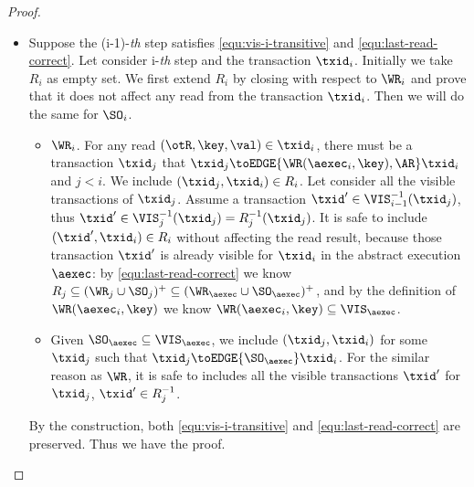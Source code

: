 \begin{proof}
\begin{itemize}
    \item {}
    Suppose the (i-1)-\emph{th} step satisfies \cref{equ:vis-i-transitive} and \cref{equ:last-read-correct}.
    Let consider i-\emph{th} step and the transaction \( \txid_i \).
    Initially we take \( R_i \) as empty set.
    We first extend \( R_i \) by closing with respect to \( \WR_i \)
    and prove that it does not affect any read from the transaction \( \txid_i \).
    Then we will do the same for \( \SO_i \).
    \begin{itemize}
        \item \( \WR_i\). For any read \( (\otR, \key, \val ) \in \txid_i \),
        there must be a transaction \( \txid_j \) that \( \txid_j \toEDGE{\WR(\aexec_i,\key), \AR} \txid_i \) and \( j < i \).
        We include \( (\txid_j, \txid_i) \in R_i \).
        Let consider all the visible transactions of \( \txid_j \).
        Assume a transaction \( \txid' \in \VIS_{i-1}^{-1}(\txid_j) \), 
        thus \( \txid' \in \VIS_{j}^{-1}(\txid_j) = R_j^{-1}(\txid_j) \).
        It is safe to include \( (\txid', \txid_i) \in R_i \) without affecting the read result,
        because those transaction \( \txid' \) is already visible for \( \txid_i \) in the abstract execution \( \aexec \):
        by \cref{equ:last-read-correct} we know \( R_j \subseteq (\WR_j \cup \SO_j)^{+} \subseteq (\WR_\aexec \cup \SO_\aexec)^{+}\),
        and by the definition of \( \WR(\aexec_i,\key) \) we know \( \WR(\aexec_i,\key) \subseteq \VIS_\aexec\).

        \item Given \( \SO_\aexec \subseteq \VIS_\aexec \), we include \( (\txid_j,\txid_i) \) for some \( \txid_j \)
        such that \( \txid_j \toEDGE{\SO_\aexec} \txid_i\).
        For the similar reason as \( \WR \),
        it is safe to includes all the visible transactions \( \txid' \) for \( \txid_j \), \ie \( \txid' \in R_j^{-1}\).
        \end{itemize}
        
    By the construction, both \cref{equ:vis-i-transitive} and \cref{equ:last-read-correct} are preserved. 
    Thus we have the proof.
    \end{itemize}
\end{proof}

